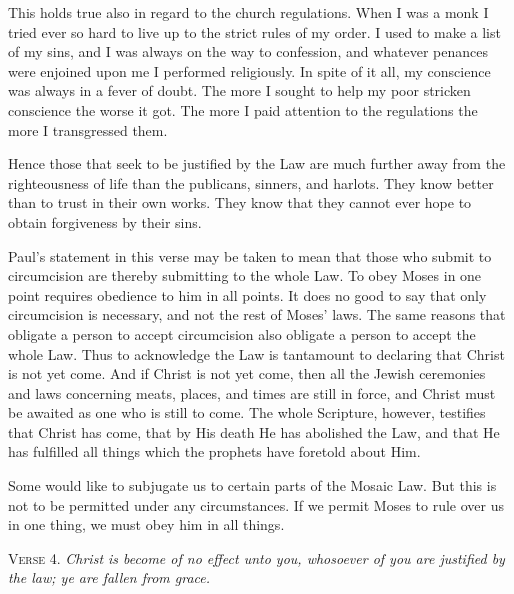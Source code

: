This holds true also in regard to the church regulations. When I was a monk I tried ever so hard to live up to the strict rules of my order. I used to make a list of my sins, and I was always on the way to confession, and whatever penances were enjoined upon me I performed religiously. In spite of it all, my conscience was always in a fever of doubt. The more I sought to help my poor stricken conscience the worse it got. The more I paid attention to the regulations the more I transgressed them.

Hence those that seek to be justified by the Law are much further away from the righteousness of life than the publicans, sinners, and harlots. They know better than to trust in their own works. They know that they cannot ever hope to obtain forgiveness by their sins.

Paul’s statement in this verse may be taken to mean that those who submit to circumcision are thereby submitting to the whole Law. To obey Moses in one point requires obedience to him in all points. It does no good to say that only circumcision is necessary, and not the rest of Moses’ laws. The same reasons that obligate a person to accept circumcision also obligate a person to accept the whole Law. Thus to acknowledge the Law is tantamount to declaring that Christ is not yet come. And if Christ is not yet come, then all the Jewish ceremonies and laws concerning meats, places, and times are still in force, and Christ must be awaited as one who is still to come. The whole Scripture, however, testifies that Christ has come, that by His death He has abolished the Law, and that He has fulfilled all things which the prophets have foretold about Him.

Some would like to subjugate us to certain parts of the Mosaic Law. But this is not to be permitted under any circumstances. If we permit Moses to rule over us in one thing, we must obey him in all things.

\textsc{Verse} 4. \emph{Christ is become of no effect unto you, whosoever of you are justified by the law; ye are fallen from grace.}


